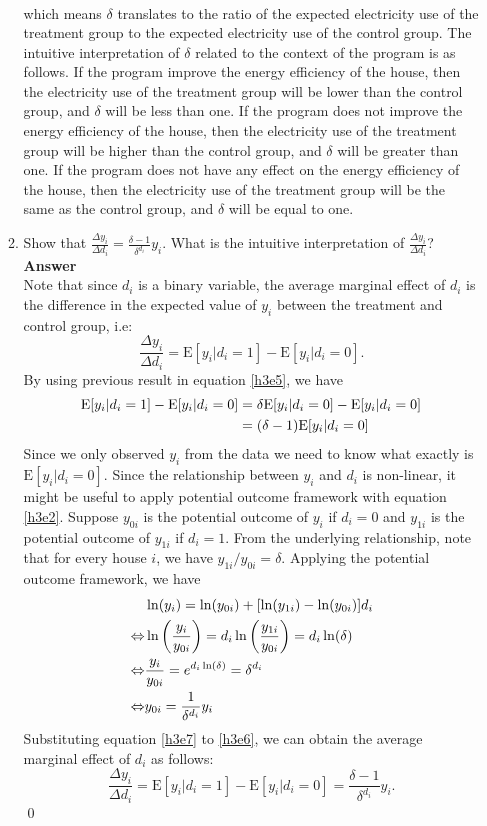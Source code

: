 \documentclass{article}
\newcommand{\E}{\text{E}}
\begin{document}
\begin{enumerate}
\begin{enumerate}
\begin{align}
    \end{align}
    which means $\delta$ translates to the ratio of the expected electricity use of the treatment group to the expected electricity use of the control group. The intuitive interpretation of $\delta$ related to the context of the program is as follows. If the program improve the energy efficiency of the house, then the electricity use of the treatment group will be lower than the control group, and $\delta$ will be less than one. If the program does not improve the energy efficiency of the house, then the electricity use of the treatment group will be higher than the control group, and $\delta$ will be greater than one. If the program does not have any effect on the energy efficiency of the house, then the electricity use of the treatment group will be the same as the control group, and $\delta$ will be equal to one.
    \item Show that $\frac{\Delta y_i}{\Delta d_i}=\frac{\delta-1}{\delta^{d_i}}y_i$. What is the intuitive interpretation of $\frac{\Delta y_i}{\Delta d_i}$?
    \\\textbf{Answer}\\
    Note that since $d_i$ is a binary variable, the average marginal effect of $d_i$ is the difference in the expected value of $y_i$ between the treatment and control group, i.e:
    \[\frac{\Delta y_i}{\Delta d_i}=\E[y_i|d_i=1]-\E[y_i|d_i=0].\]
    By using previous result in equation \eqref{h3e5}, we have 
    \begin{align}
        \E[y_i|d_i=1]-\E[y_i|d_i=0]&=\delta\E[y_i|d_i=0]-\E[y_i|d_i=0]\notag\\
        &=(\delta-1)\E[y_i|d_i=0] \label{h3e6}
    \end{align}
    Since we only observed $y_i$ from the data we need to know what exactly is $\E[y_i|d_i=0]$. Since the relationship between $y_i$ and $d_i$ is non-linear, it might be useful to apply potential outcome framework with equation \eqref{h3e2}. Suppose $y_{0i}$ is the potential outcome of $y_i$ if $d_i=0$ and $y_{1i}$ is the potential outcome of $y_{1i}$ if $d_i=1$. From the underlying relationship, note that for every house $i$, we have $y_{1i}/y_{0i}=\delta$. Applying the potential outcome framework, we have
    \begin{align}
        &\ln(y_i)=\ln(y_{0i})+[\ln(y_{1i})-\ln(y_{0i})]d_i \notag\\
        \Leftrightarrow& \ln\left(\frac{y_i}{y_{0i}}\right)=d_i\ln\left(\frac{y_{1i}}{y_{0i}}\right)=d_i\ln(\delta) \notag\\
        \Leftrightarrow& \frac{y_i}{y_{0i}}=e^{d_i\ln(\delta)}=\delta^{d_i} \notag\\
        \Leftrightarrow& y_{0i}=\frac{1}{\delta^{d_i}}y_i \label{h3e7}
    \end{align}
    Substituting equation \eqref{h3e7} to \eqref{h3e6}, we can obtain the average marginal effect of $d_i$ as follows:
    \[\frac{\Delta y_i}{\Delta d_i}=\E[y_i|d_i=1]-\E[y_i|d_i=0]=\frac{\delta-1}{\delta^{d_i}}y_i.\]\qed


\end{enumerate}
\end{enumerate}
\end{document}
